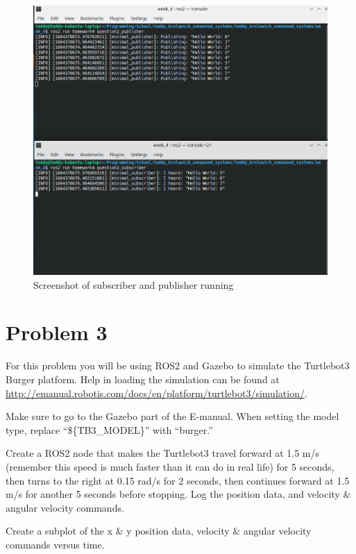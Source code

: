 \documentclass{article}
\begin{document}
\begin{figure}[H]
  \centering
  \includegraphics[width=\textwidth]{question2.png}
  \caption*{Screenshot of subscriber and publisher running}
\end{figure}

\bigskip
\section*{Problem 3}

For this problem you will be using ROS2 and Gazebo to simulate the Turtlebot3 Burger platform.  
Help in loading the simulation can be found at 
\url{http://emanual.robotis.com/docs/en/platform/turtlebot3/simulation/}.

\bigskip
\noindent Make sure to go to the Gazebo part of the E-manual. When setting the model type, replace “\$\{TB3\_MODEL\}” with 
“burger.” 

\bigskip
\noindent Create a ROS2 node that makes the Turtlebot3 travel forward at 1.5 m/s (remember this speed is 
much faster than it can do in real life) for 5 seconds, then turns to the right at 0.15 rad/s for 2 
seconds, then continues forward at 1.5 m/s for another 5 seconds before stopping. Log the position 
data, and velocity \& angular velocity commands.

\bigskip 
\noindent Create a subplot of the x \& y position data, velocity \& angular velocity commands versus time. 
\end{document}
